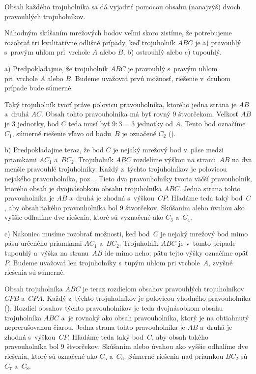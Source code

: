 {%
\napad
Obsah každého trojuholníka sa dá vyjadriť pomocou obsahu (nanajvýš) dvoch
pravouhlých trojuholníkov.

\riesenie
Náhodným skúšaním mrežových bodov veľmi skoro zistíme, že potrebujeme
rozobrať tri kvalitatívne odlišné prípady, keď trojuholník $ABC$ je
a) pravouhlý s~pravým uhlom pri~vrchole $A$ alebo $B$, b) ostrouhlý alebo c) tupouhlý.

a)
Predpokladajme, že trojuholník $ABC$ je pravouhlý s~pravým uhlom pri~vrchole $A$ alebo $B$.
Budeme uvažovať prvú možnosť, riešenie v~druhom prípade bude súmerné.

Taký trojuholník tvorí práve polovicu pravouholníka, ktorého jedna strana je
$AB$ a~druhá $AC$.
Obsah tohto pravouholníka má byť rovný 9 štvorčekom.
Veľkosť $AB$ je 3 jednotky, bod $C$ teda musí byť $9:3=3$ jednotky od $A$.
Tento bod označíme $C_1$, súmerné riešenie vľavo od bodu~$B$ je označené
$C_2$ (\obr).


b)
Predpokladajme teraz, že bod $C$ je nejaký mrežový bod v~páse medzi priamkami
$AC_1$ a~$BC_2$.
Trojuholník $ABC$ rozdelíme výškou na stranu~$AB$ na dva menšie pravouhlé
trojuholníky.
Každý z~týchto trojuholníkov je polovicou nejakého pravouholníka, poz. \obr.
Tieto dva pravouholníky tvoria väčší pravouholník, ktorého obsah je dvojnásobkom obsahu
trojuholníka $ABC$.
Jedna strana tohto pravouholníka je $AB$ a~druhá je zhodná s~výškou~$CP$.
Hľadáme teda taký bod~$C$, aby obsah takého pravouholníka bol 9 štvorčekov.
Skúšaním alebo úvahou ako vyššie odhalíme dve riešenia, ktoré sú vyznačené ako
$C_3$ a~$C_4$.

c)
Nakoniec musíme rozobrať možnosti, keď bod~$C$ je nejaký mrežový bod
mimo pásu určeného priamkami $AC_1$ a~$BC_2$.
Trojuholník $ABC$ je v~tomto prípade tupouhlý a~výška na stranu~$AB$ ide
mimo neho; pätu tejto výšky označíme opäť~$P$.
Budeme uvažovať len trojuholníky s~tupým uhlom pri vrchole~$A$, zvyšné riešenia
sú súmerné.

Obsah trojuholníka $ABC$ je teraz rozdielom obsahov pravouhlých trojuholníkov
$CPB$ a~$CPA$.
Každý z~týchto trojuholníkov je polovicou vhodného pravouholníka (\obr).
Rozdiel obsahov týchto pravouholníkov je teda dvojnásobkom obsahu trojuholníka
$ABC$ a~je rovnaký ako obsah pravouholníka, ktorý je na  obtiahnutý neprerušovanou čiarou.
Jedna strana tohto pravouholníka je $AB$ a~druhá je zhodná s~výškou~$CP$.
Hľadáme teda taký bod~$C$, aby obsah takého pravouholníka bol 9 štvorčekov.
Skúšaním alebo úvahou ako vyššie odhalíme dve riešenia, ktoré sú označené ako
$C_5$ a~$C_6$.
Súmerné riešenia nad priamkou $BC_2$ sú $C_7$ a~$C_8$.

}
